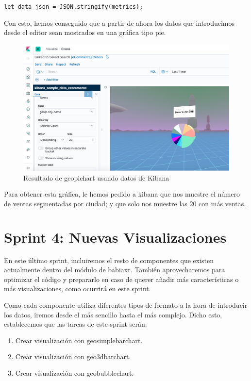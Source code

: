 \documentclass[a4paper, 12pt]{book}
\begin{document}
\begin{lstlisting}[frame=single]
let data_json = JSON.stringify(metrics);
\end{lstlisting}

Con esto, hemos conseguido que a partir de ahora los datos que introducimos desde el editor sean mostrados en una gráfica tipo pie.

\begin{figure}[H]
  \centering
  \includegraphics[width=12cm, keepaspectratio]{img/development/pie-con-data.png}
  \caption{Resultado de geopichart usando datos de Kibana}
  \label{fig:piecondata}
\end{figure}

Para obtener esta gráfica, le hemos pedido a kibana que nos muestre el número de ventas segmentadas por ciudad; y que solo nos muestre las 20 con más ventas.


\section{Sprint 4: Nuevas Visualizaciones }
\label{sec:sprint4}

En este último sprint, incluiremos el resto de componentes que existen actualmente dentro del módulo de babiaxr. También aprovecharemos para optimizar el código y prepararlo en caso de querer añadir más características o más visualizaciones, como ocurrirá en este sprint.

Como cada componente utiliza diferentes tipos de formato a la hora de introducir los datos, iremos desde el más sencillo hasta el más complejo. Dicho esto, establecemos que las tareas de este sprint serán:

\begin{enumerate}
    \item Crear visualización con geosimplebarchart.
    \item Crear visualización con geo3dbarchart.
    \item Crear visualización con geobubblechart.
\end{enumerate}
\end{document}
